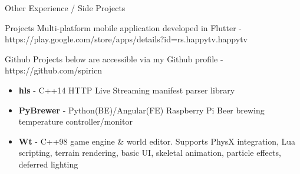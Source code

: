 \documentclass[]{mcdowellcv}
\begin{document}
	\begin{cvsection}{Other Experience / Side Projects}
		\begin{cvsubsection}{Projects}{}{}
			Multi-platform mobile application developed in Flutter - https://play.google.com/store/apps/details?id=rs.happytv.happytv
		\end{cvsubsection}

		\begin{cvsubsection}{Github}{}{}
			Projects below are accessible via my Github profile - https://github.com/spiricn
			\begin{itemize}
				\item \textbf{hls} - C++14 HTTP Live Streaming manifest parser library
				\item \textbf{PyBrewer} - Python(BE)/Angular(FE) Raspberry Pi Beer brewing temperature controller/monitor
				\item \textbf{Wt} - C++98 game engine \& world editor. Supports PhysX integration, Lua scripting, terrain rendering, basic UI, skeletal animation, particle effects, deferred lighting
			\end{itemize}

		\end{cvsubsection}
	\end{cvsection}
\end{document}
